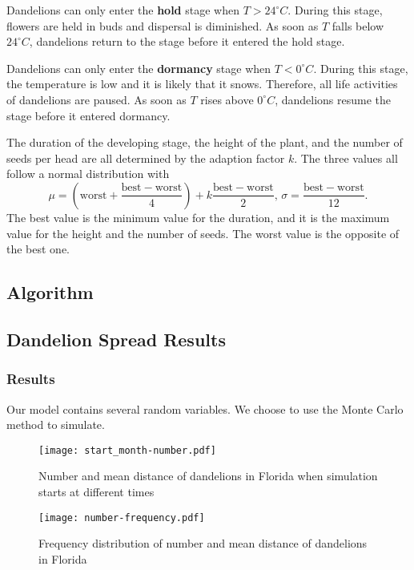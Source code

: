 \documentclass[12pt]{article}
\begin{document}
		Dandelions can only enter the \textbf{hold} stage when $T > 24^\circ C$.  During this stage, flowers are held in buds and dispersal is diminished.  As soon as $T$ falls below $24^\circ C$, dandelions return to the stage before it entered the hold stage.  
		
		Dandelions can only enter the \textbf{dormancy} stage when $T < 0^\circ C$.  During this stage, the temperature is low and it is likely that it snows.  Therefore, all life activities of dandelions are paused.  As soon as $T$ rises above $0^\circ C$, dandelions resume the stage before it entered dormancy.
		
		The duration of the developing stage, the height of the plant, and the number of seeds per head are all determined by the adaption factor $k$.  The three values all follow a normal distribution with
		\[
			\mu = \left( \mathrm{worst} + \frac{\mathrm{best} - \mathrm{worst}}4 \right) + k \frac{\mathrm{best} - \mathrm{worst}}2, \,
			\sigma = \frac{\mathrm{best} - \mathrm{worst}}{12}.
		\]
		The best value is the minimum value for the duration, and it is the maximum value for the height and the number of seeds.  The worst value is the opposite of the best one.
		
	\subsection{Algorithm}
	
	\subsection{Dandelion Spread Results}
	
		\subsubsection{Results}
		
			Our model contains several random variables.  We choose to use the Monte Carlo method to simulate.
			
			\begin{figure}
				\centering
				\texttt{[image: start\_month-number.pdf]}
				\caption{Number and mean distance of dandelions in Florida when simulation starts at different times}
				\label{fig:start}
			\end{figure}
			
			\begin{figure}
				\centering
				\texttt{[image: number-frequency.pdf]}
				\caption{Frequency distribution of number and mean distance of dandelions in Florida}
				\label{fig:freqDand}
			\end{figure}
			
\end{document}

